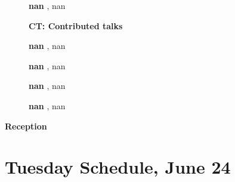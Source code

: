 \documentclass[ILAS2025-program.tex]{subfiles}
\begin{document}
\begin{description}
\begin{description}
        \item[] \textbf{nan} , nan
        \end{description}
    \begin{description}
    \item[] {\color{mstitle}\textbf{CT: Contributed talks}} 
    \item[] \textbf{nan} , nan
        \item[] \textbf{nan} , nan
        \item[] \textbf{nan} , nan
        \item[] \textbf{nan} , nan
        \end{description}
    \item[\info{18:00\textrm{--}20:00}] \textbf{Reception} 
    \end{description}
    \newpage

\section{Tuesday Schedule, June 24}
    
\end{document}

